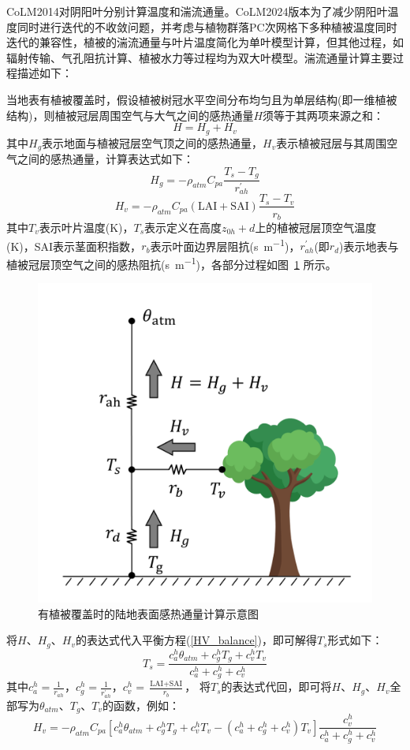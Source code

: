 CoLM2014对阴阳叶分别计算温度和湍流通量。CoLM2024版本为了减少阴阳叶温度同时进行迭代的不收敛问题，并考虑与植物群落PC次网格下多种植被温度同时迭代的兼容性，植被的湍流通量与叶片温度简化为单叶模型计算，但其他过程，如辐射传输、气孔阻抗计算、植被水力等过程均为双大叶模型。湍流通量计算主要过程描述如下：

当地表有植被覆盖时，假设植被树冠水平空间分布均匀且为单层结构(即一维植被结构)，则植被冠层周围空气与大气之间的感热通量$H$须等于其两项来源之和：
\begin{equation}\label{HV_balance}
H=H_{g}+H_{v}
\end{equation}
其中$H_{g}$表示地面与植被冠层空气顶之间的感热通量，$H_{v}$表示植被冠层与其周围空气之间的感热通量，计算表达式如下：
\begin{equation}
H_{g}=-\rho_{atm} C_{pa} \frac{T_{s}-T_{g}}{r_{a h}^{\prime}}
\end{equation}
\begin{equation}
H_{v}=-\rho_{atm} C_{pa}(\text {LAI}+\text {SAI}) \frac{T_{s}-T_{v}}{r_{b}}
\end{equation}
其中$T_v$表示叶片温度(K)，$T_s$表示定义在高度$z_{0h}+d$上的植被冠层顶空气温度(K)，SAI表示茎面积指数，$r_b$表示叶面边界层阻抗(\unit{s.m^{-1}})，$r_{ah}^\prime$(即$r_d$)表示地表与植被冠层顶空气之间的感热阻抗(\unit{s.m^{-1}})，各部分过程如图~\ref{fig:有植被覆盖部分的陆地表面感热通量示意图} 所示。
{
\begin{figure}[htbp]
\centering
\includegraphics[width=0.6\linewidth]{Figures/地表湍流交换过程/有植被感热交换阻抗示意图.png}
\caption{有植被覆盖时的陆地表面感热通量计算示意图}
\label{fig:有植被覆盖部分的陆地表面感热通量示意图}
\end{figure}
}
将$H$、$H_{g}$、$H_{v}$的表达式代入平衡方程(\ref{HV_balance})，即可解得$T_s$形式如下：
\begin{equation}
T_{s}=\frac{c_{a}^{h} \theta_{atm}+c_{g}^{h} T_{g}+c_{v}^{h} T_{v}}{c_{a}^{h}+c_{g}^{h}+c_{v}^{h}}
\end{equation}
其中$c_a^h=\frac{1}{r_{ah}}$，$c_g^h=\frac{1}{r_{ah}^\prime}$，$c_v^h=\frac{\text {LAI}+\text {SAI}}{r_b}$，
将$T_s$的表达式代回，即可将$H$、$H_{g}$、$H_{v}$全部写为$\theta_{atm}$、$T_g$、$T_v$的函数，例如：
\begin{equation}
H_{v}=-\rho_{atm} C_{p a}\left[c_{a}^{h} \theta_{atm}+c_{g}^{h} 
T_{g}+c_{v}^{h} T_{v}-\left(c_{a}^{h}+c_{g}^{h}+c_{v}^{h}\right)
T_{v}\right] \frac{c_{v}^{h}}{c_{a}^{h}+c_{g}^{h}+c_{v}^{h}}
\end{equation}


